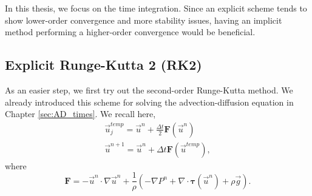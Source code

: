 In this thesis, we focus on the time integration. 
Since an explicit scheme tends to show lower-order convergence and more stability issues, having an implicit method performing a higher-order convergence would be beneficial.  
\subsection{Explicit Runge-Kutta 2 (RK2)}
As an easier step, we first try out the second-order Runge-Kutta method. We already introduced this scheme for solving the advection-diffusion equation in Chapter \ref{sec:AD_times}. We recall here, 
\begin{align}
	\vec{u}_{j}^{temp} = \vec{u}^{n} + \frac{\Delta t}{2} {\bm F} \left( \vec{u}^{n} \right)
	\label{eq_RK2_s1} \\ 
	\vec{u}^{n+1} = \vec{u}^{n} + \Delta t {\bm F} \left( \vec{u}^{temp} \right),
	\label{eq_RK2_s2}
\end{align}
where 
\[
  {\bm F} = 
    -\vec{u}^n \cdot \nabla \vec{u}^n 
    +\frac{1}{\rho}
    \left(
    - \nabla P^n 
        + \nabla \cdot   \bm{\tau}(\vec{u}^n)
        +  \rho  \vec{g} 
        \right).
\]


